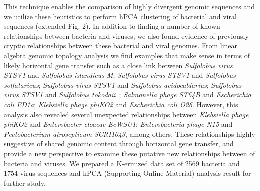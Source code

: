 \documentclass[12pt]{article}
\begin{document}
This technique enables the comparison of highly divergent genomic sequences and we utilize these heuristics to perform hPCA clustering of bacterial and viral sequences (extended Fig. 2). In addition to finding a number of known relationships between bacteria and viruses, we also found evidence of previously cryptic relationships between these bacterial and viral genomes. From linear algebra genomic topology analysis we find examples that make sense in terms of likely horizontal gene transfer such as a close link between \emph{Sulfolobus virus STSV1} and \emph{Sulfolobus islandicus M}; \emph{Sulfolobus virus STSV1} and \emph{Sulfolobus solfataricus}; \emph{Sulfolobus virus STSV1} and \emph{Sulfolobus acidocaldarius}; \emph{Sulfolobus virus STSV1} and \emph{Sulfolobus tokodaii}~\cite{Xiang:2005aa}; \emph{Salmonella phage ST64B} and \emph{Escherichia coli ED1a}; \emph{Klebsiella phage phiKO2} and \emph{Escherichia coli O26}. However, this analysis also revealed several unexpected relationships between \emph{Klebsiella phage phiKO2} and \emph{Enterobacter cloacae EcWSU1}; \emph{Enterobacteria phage N15} and \emph{Pectobacterium atrosepticum SCRI1043}, among others. These relationships highly suggestive of shared genomic content through horizontal gene transfer, and provide a new perspective to examine these putative new relationships between of bacteria and viruses. We prepared a K-ermized data set of 2569 bacteria and 1754 virus sequences and hPCA (Supporting Online Material) analysis result for further study. \\
\end{document}
